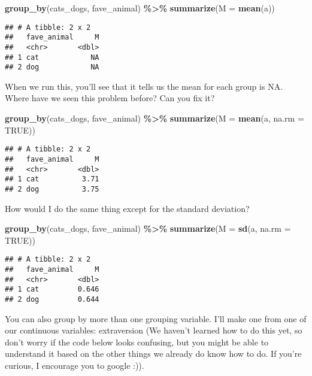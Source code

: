 \documentclass[
]{article}
\newenvironment{Shaded}{\begin{snugshade}}{\end{snugshade}}
\newcommand{\AttributeTok}[1]{\textcolor[rgb]{0.13,0.29,0.53}{#1}}
\newcommand{\ConstantTok}[1]{\textcolor[rgb]{0.56,0.35,0.01}{#1}}
\newcommand{\FunctionTok}[1]{\textcolor[rgb]{0.13,0.29,0.53}{\textbf{#1}}}
\newcommand{\NormalTok}[1]{#1}
\newcommand{\SpecialCharTok}[1]{\textcolor[rgb]{0.81,0.36,0.00}{\textbf{#1}}}
\begin{document}
\begin{Shaded}
\begin{Highlighting}[]
\FunctionTok{group\_by}\NormalTok{(cats\_dogs, fave\_animal) }\SpecialCharTok{\%\textgreater{}\%} 
  \FunctionTok{summarize}\NormalTok{(}\AttributeTok{M =} \FunctionTok{mean}\NormalTok{(a))}
\end{Highlighting}
\end{Shaded}

\begin{verbatim}
## # A tibble: 2 x 2
##   fave_animal     M
##   <chr>       <dbl>
## 1 cat            NA
## 2 dog            NA
\end{verbatim}

When we run this, you'll see that it tells us the mean for each group is
NA. Where have we seen this problem before? Can you fix it?

\begin{Shaded}
\begin{Highlighting}[]
\FunctionTok{group\_by}\NormalTok{(cats\_dogs, fave\_animal) }\SpecialCharTok{\%\textgreater{}\%} 
  \FunctionTok{summarize}\NormalTok{(}\AttributeTok{M =} \FunctionTok{mean}\NormalTok{(a, }\AttributeTok{na.rm =} \ConstantTok{TRUE}\NormalTok{))}
\end{Highlighting}
\end{Shaded}

\begin{verbatim}
## # A tibble: 2 x 2
##   fave_animal     M
##   <chr>       <dbl>
## 1 cat          3.71
## 2 dog          3.75
\end{verbatim}

How would I do the same thing except for the standard deviation?

\begin{Shaded}
\begin{Highlighting}[]
\FunctionTok{group\_by}\NormalTok{(cats\_dogs, fave\_animal) }\SpecialCharTok{\%\textgreater{}\%} 
  \FunctionTok{summarize}\NormalTok{(}\AttributeTok{M =} \FunctionTok{sd}\NormalTok{(a, }\AttributeTok{na.rm =} \ConstantTok{TRUE}\NormalTok{))}
\end{Highlighting}
\end{Shaded}

\begin{verbatim}
## # A tibble: 2 x 2
##   fave_animal     M
##   <chr>       <dbl>
## 1 cat         0.646
## 2 dog         0.644
\end{verbatim}

You can also group by more than one grouping variable. I'll make one
from one of our continuous variables: extraversion (We haven't learned
how to do this yet, so don't worry if the code below looks confusing,
but you might be able to understand it based on the other things we
already do know how to do. If you're curious, I encourage you to google
:)).
\end{document}
